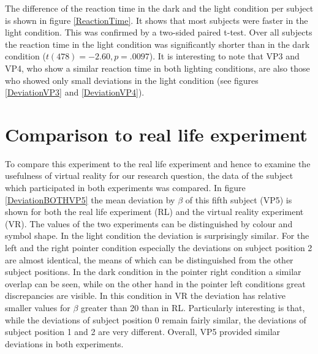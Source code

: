 The difference of the reaction time in the dark and the light condition per subject is shown in figure \ref{ReactionTime}. It shows that most subjects were faster in the light condition. This was confirmed by a two-sided paired t-test. Over all subjects the reaction time in the light condition was significantly shorter than in the dark condition ($t(478) = -2.60, p = .0097$). It is interesting to note that VP3 and VP4, who show a similar reaction time in both lighting conditions, are also those who showed only small deviations in the light condition (see figures \ref{DeviationVP3} and \ref{DeviationVP4}). 


\section{Comparison to real life experiment}
To compare this experiment to the real life experiment and hence to examine the usefulness of virtual reality for our research question, the data of the subject which participated in both experiments was compared. In figure \ref{DeviationBOTHVP5} the mean deviation by $\beta$ of this fifth subject (VP5) is shown for both the real life experiment (RL) and the virtual reality experiment (VR). The values of the two experiments can be distinguished by colour and symbol shape. In the light condition the deviation is surprisingly similar. For the left and the right pointer condition especially the deviations on subject position 2 are almost identical, the means of which can be distinguished from the other subject positions. In the dark condition in the pointer right condition a similar overlap can be seen, while on the other hand in the pointer left conditions great discrepancies are visible. In this condition in VR the deviation has relative smaller values for $\beta$ greater than 20\textdegree{} than in RL. Particularly interesting is that, while the deviations of subject position 0 remain fairly similar, the deviations of subject position 1 and 2 are very different. Overall, VP5 provided similar deviations in both experiments.


